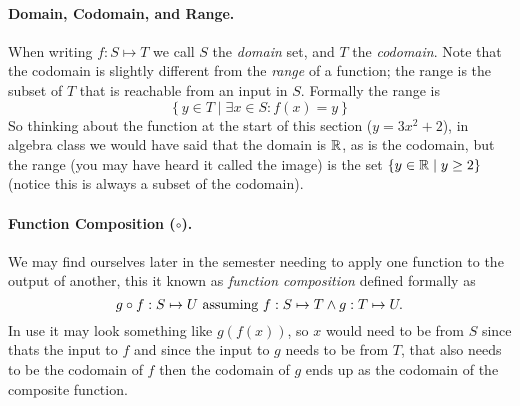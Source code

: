 \documentclass[11pt, oneside]{article}   	%
\begin{document}
\paragraph{Domain, Codomain, and Range.}
When writing $f: S \mapsto T$ we call $S$ the \emph{domain} set, and $T$ the \emph{codomain}. 
Note that the codomain is slightly different from the \emph{range} of a function; 
the range is the subset of $T$ that is reachable from an input in $S$. 
Formally the range is 
\[
\left\{y \in T \mid \exists x \in S : f(x) = y\right\}
\]
So thinking about the function at the start of this section ($y = 3x^2 + 2$), 
in algebra class we would have said that the domain is $\operatorname{\mathbb{R}}$, as is the codomain, but the range (you may have heard it called the image) 
is the set $\left\{y \in \operatorname{\mathbb{R}} \mid y \ge 2\right\}$ (notice this is always a subset of the codomain). 

\paragraph{Function Composition ($\circ$).}
We may find ourselves later in the semester needing to apply one function to the output of another,
this it known as \emph{function composition} defined formally as
\[
g\circ f: S \mapsto U \textnormal{ assuming } f: S \mapsto T \wedge g : T \mapsto U.
\]
In use it may look something like $g\left(f\left(x\right)\right)$, 
so $x$ would need to be from $S$ since thats the input to $f$ and since the input to $g$ needs to be from $T$, 
that also needs to be the codomain of $f$ then the codomain of $g$ ends up as the codomain of the composite function. 
\end{document}
